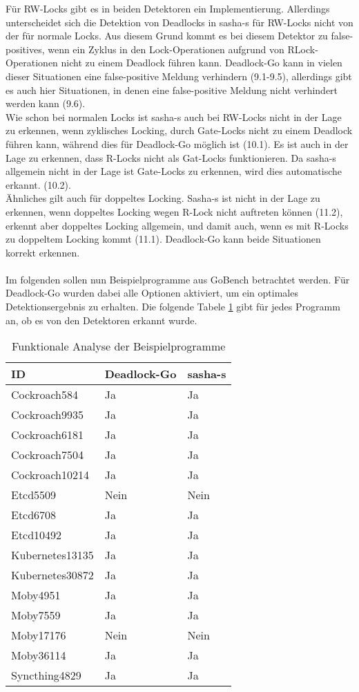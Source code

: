 Für RW-Locks gibt es in beiden Detektoren ein Implementierung. Allerdings unterscheidet
sich die Detektion von Deadlocks in sasha-s für RW-Locks nicht von der für 
normale Locks. Aus diesem Grund kommt es bei diesem Detektor zu false-positives,
wenn ein Zyklus in den Lock-Operationen aufgrund von RLock-Operationen nicht 
zu einem Deadlock führen kann. Deadlock-Go kann in vielen dieser Situationen 
eine false-positive Meldung verhindern (9.1-9.5), allerdings gibt es auch hier 
Situationen, in denen eine false-positive Meldung nicht verhindert werden kann (9.6).\\
Wie schon bei normalen Locks ist sasha-s auch bei RW-Locks nicht in der Lage 
zu erkennen, wenn zyklisches Locking, durch Gate-Locks nicht zu einem Deadlock 
führen kann, während dies für Deadlock-Go möglich ist (10.1). Es ist auch in der Lage 
zu erkennen, dass R-Locks nicht als Gat-Locks funktionieren. Da sasha-s allgemein 
nicht in der Lage ist Gate-Locks zu erkennen, wird dies automatische erkannt. (10.2).\\
Ähnliches gilt auch für doppeltes Locking. Sasha-s ist 
nicht in der Lage zu erkennen, wenn doppeltes Locking wegen R-Lock nicht auftreten 
können (11.2), erkennt aber doppeltes Locking allgemein, und damit auch, wenn 
es mit R-Locks zu doppeltem Locking kommt (11.1). Deadlock-Go kann beide Situationen
korrekt erkennen.
\\\\
Im folgenden sollen nun Beispielprogramme aus GoBench
betrachtet werden. Für Deadlock-Go wurden dabei alle Optionen aktiviert, um ein 
optimales Detektionsergebnis zu erhalten.
Die folgende Tabele \ref{Tab::Analyse:Functional.Example} gibt für jedes Programm an,
 ob es von den Detektoren erkannt wurde.
\begin{table}[H]
\centering
\begin{tabular}{|l|l|l|}
\hline
\textbf{ID} & \textbf{Deadlock-Go} & \textbf{sasha-s} \\ \hline
Cockroach584 & Ja & Ja \\ \hline
Cockroach9935 & Ja & Ja \\ \hline
Cockroach6181 & Ja & Ja \\ \hline
Cockroach7504 & Ja & Ja \\ \hline
Cockroach10214 & Ja & Ja \\ \hline
Etcd5509 & Nein & Nein \\ \hline
Etcd6708 & Ja & Ja \\ \hline
Etcd10492 & Ja & Ja \\ \hline
Kubernetes13135 & Ja & Ja \\ \hline
Kubernetes30872 & Ja & Ja \\ \hline
Moby4951 & Ja & Ja \\ \hline
Moby7559 & Ja & Ja \\ \hline
Moby17176 & Nein & Nein \\ \hline
Moby36114 & Ja & Ja \\ \hline
Syncthing4829 & Ja & Ja \\ \hline
\end{tabular}
\caption{Funktionale Analyse der Beispielprogramme}
\label{Tab::Analyse:Functional.Example}
\end{table}

